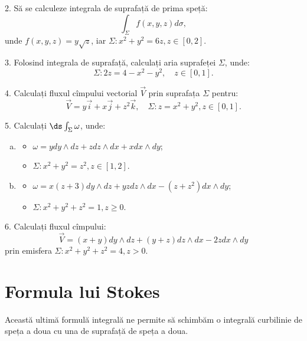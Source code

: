 2. Să se calculeze integrala de suprafață de prima speță:
\[
  \int_\Sigma f(x, y, z) d\sigma,
\]
unde $ f(x, y, z) = y \sqrt{z} $, iar $ \Sigma: x^2 + y^2 = 6z, z \in [0, 2] $.

\vspace{0.5cm}

3. Folosind integrala de suprafață, calculați aria suprafeței $ \Sigma $, unde:
\[
  \Sigma : 2z = 4 - x^2 - y^2, \quad z \in [0, 1].
\]

\vspace{0.5cm}

4. Calculați fluxul cîmpului vectorial $ \vec{V} $ prin suprafața $ \Sigma $
pentru:
\[
  \vec{V} = y\vec{i} + x\vec{j} + z^2 \vec{k}, \quad %
  \Sigma : z = x^2 + y^2, z \in [0, 1].
\]

\vspace{0.5cm}

5. Calculați $ \ds\int_\Sigma \omega $, unde:
\begin{enumerate}[(a)]
\item
  \begin{itemize}
  \item $ \omega = y dy \wedge dz + z dz \wedge dx + x dx \wedge dy $;
  \item $ \Sigma : x^2 + y^2 = z^2, z \in [1, 2] $.
  \end{itemize}
\item
  \begin{itemize}
  \item $ \omega = x(z + 3) dy \wedge dz + yz dz \wedge dx - %
    (z + z^2) dx \wedge dy $;
  \item $ \Sigma : x^2 + y^2 + z^2 = 1, z \geq 0 $.
  \end{itemize}
\end{enumerate}

\vspace{0.5cm}

6. Calculați fluxul cîmpului:
\[
  \vec{V} = (x + y) dy \wedge dz + (y + z) dz \wedge dx -2z dx \wedge dy
\]
prin emisfera $ \Sigma: x^2 + y^2 + z^2 = 4, z > 0 $.


\section{Formula lui Stokes}
Această ultimă formulă integrală ne permite să schimbăm o integrală curbilinie
de speța a doua cu una de suprafață de speța a doua.

